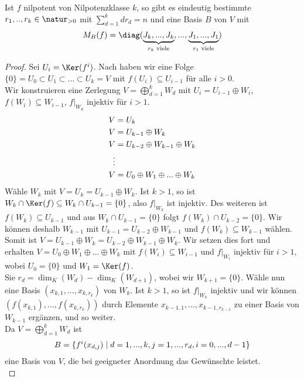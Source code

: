 \begin{proposition}
	Ist $f$ nilpotent von Nilpotenzklasse $k$, so gibt es eindeutig bestimmte $r_1,..,r_k\in\natur_{>0}$ mit $\sum\limits_{d=1}^k dr_d=n$ und eine Basis $B$ von $V$ mit 
	\begin{align}
		M_B(f)=\diag(\underbrace{J_k,...,J_k}_{r_k\text{ viele}},...,\underbrace{J_1,...,J_1}_{r_1\text{ viele}})\notag
	\end{align}
\end{proposition}
\begin{proof}
	Sei $U_i=\Ker(f^i)$. Nach  haben wir eine Folge $\{0\}=U_0\subset U_1\subset ...\subset U_k=V$ mit $f(U_i)\subseteq U_{i-1}$ für alle $i>0$. \\
	Wir konstruieren eine Zerlegung $V=\bigoplus\limits_{d=1}^k W_d$ mit $U_i=U_{i-1}\oplus W_i$, $f(W_i)\subseteq W_{i-1}$, $f\vert_{W_d}$ injektiv für $i>1$.
	\begin{align}
		V&= U_k\notag \\
		V&= U_{k-1}\oplus W_k \notag \\
		V&= U_{k-2}\oplus W_{k-1}\oplus W_k \notag \\
		\vdots \notag \\
		V&= U_0 \oplus W_1\oplus ... \oplus W_k\notag
	\end{align}
	Wähle $W_k$ mit $V=U_k=U_{k-1}\oplus W_k$. Ist $k>1$, so ist $W_k\cap \Ker(f)\subseteq W_k\cap U_{k-1}=\{0\}$, also $f\vert_{W_k}$ ist injektiv. Des weiteren ist $f(W_k)\subseteq U_{k-1}$ und aus $W_k\cap U_{k-1}=\{0\}$ folgt $f(W_k)\cap U_{k-2}=\{0\}$. Wir können deshalb $W_{k-1}$ mit $U_{k-1}=U_{k-2}\oplus W_{k-1}$ und $f(W_k)\subseteq W_{k-1}$ wählen. Somit ist $V=U_{k-1}\oplus W_k=U_{k-2}\oplus W_{k-1}\oplus W_k$. Wir setzen dies fort und erhalten $V= U_0 \oplus W_1\oplus ... \oplus W_k$ mit $f(W_i)\subseteq W_{i-1}$ und $f\vert_{W_i}$ injektiv für $i>1$, wobei $U_0=\{0\}$ und $W_1=\Ker(f)$. \\
	Sie $r_d=\dim_K(W_d)-\dim_K(W_{d+1})$, wobei wir $W_{k+1}=\{0\}$. Wähle nun eine Basis $(x_{k,1},...,x_{k,r_k})$ von $W_k$. Ist $k>1$, so ist $f\vert_{W_k}$ injektiv und wir können $(f(x_{k,1}),...,f(x_{k,r_k}))$ durch Elemente $x_{k-1,1},...,x_{k-1,r_{k-1}}$ zu einer Basis von $W_{k-1}$ ergänzen, und so weiter.\\
	Da $V=\bigoplus\limits_{d=1}^k W_d$ ist
	\begin{align}
		B=\{f^i(x_{d,j})\mid d=1,...,k,j=1,...,r_d,i=0,...,d-1\}\notag
	\end{align}
	eine Basis von $V$, die bei geeigneter Anordnung das Gewünschte leistet. \\

\end{proof}

